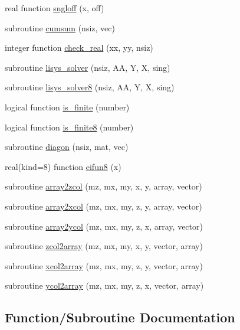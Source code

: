 \begin{DoxyCompactItemize}
\item 
real function \hyperlink{numutils_8f90_a97ff3973394dba1b9534e055e358de97}{sngloff} (x, off)
\item 
subroutine \hyperlink{numutils_8f90_a4c6620f6e7e0c517c0680ce839de1a3e}{cumsum} (nsiz, vec)
\item 
integer function \hyperlink{numutils_8f90_a150883e942654a69b910d409aff3ab11}{check\+\_\+real} (xx, yy, nsiz)
\item 
subroutine \hyperlink{numutils_8f90_aed75a09149da8b66e7ed22e28d081c65}{lisys\+\_\+solver} (nsiz, A\+A, Y, X, sing)
\item 
subroutine \hyperlink{numutils_8f90_a4a474fb2edbafe34d84319dd1ffe33b3}{lisys\+\_\+solver8} (nsiz, A\+A, Y, X, sing)
\item 
logical function \hyperlink{numutils_8f90_a356dac086cc0a55c018133b955b8623b}{is\+\_\+finite} (number)
\item 
logical function \hyperlink{numutils_8f90_a695c126cc1d3849b237378e567623975}{is\+\_\+finite8} (number)
\item 
subroutine \hyperlink{numutils_8f90_a1c300c3f8e7655f895404d3bb918f670}{diagon} (nsiz, mat, vec)
\item 
real(kind=8) function \hyperlink{numutils_8f90_a87009269fa8aecf49be15f20599f3052}{eifun8} (x)
\item 
subroutine \hyperlink{numutils_8f90_a4729e98a12ce5e8cec69efa1d7e7e505}{array2zcol} (mz, mx, my, x, y, array, vector)
\item 
subroutine \hyperlink{numutils_8f90_aa85bcfd6bde31917552031655bbfa562}{array2xcol} (mz, mx, my, z, y, array, vector)
\item 
subroutine \hyperlink{numutils_8f90_a779adf7360ff4e63f7c87643af734fd4}{array2ycol} (mz, mx, my, z, x, array, vector)
\item 
subroutine \hyperlink{numutils_8f90_a1c3b4e4df696e6580d47ec58fdd5ca66}{zcol2array} (mz, mx, my, x, y, vector, array)
\item 
subroutine \hyperlink{numutils_8f90_aec848707c159e9a2b71a8c4a1060b078}{xcol2array} (mz, mx, my, z, y, vector, array)
\item 
subroutine \hyperlink{numutils_8f90_ac925c612eb36229ca068d721a6262204}{ycol2array} (mz, mx, my, z, x, vector, array)
\end{DoxyCompactItemize}


\subsection{Function/\+Subroutine Documentation}
\hypertarget{numutils_8f90_abf96507f2f57d7059bb52112f82ccd02}{}
